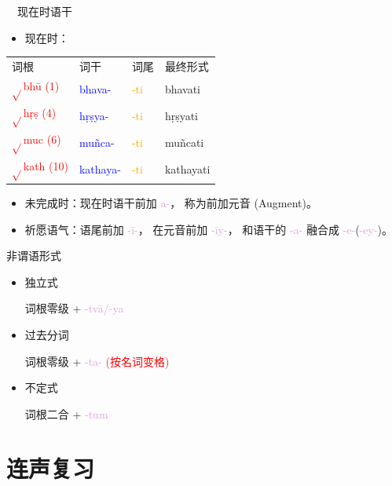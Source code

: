 \documentclass[17pt]{beamer}
\newcommand{\verbroot}[1]{\textcolor{red}{$\sqrt{}$#1}}
\newcommand{\verbstem}[1]{\textcolor{blue}{#1\nobreakdash-}}
\newcommand{\wordending}[1]{\textcolor{Orange}{\nobreakdash-#1}}
\newcommand{\fullpada}[1]{\textcolor{OliveGreen}{#1}}
\newcommand{\pratyaya}[1]{\textcolor{Plum}{#1}}
\newcommand{\veryimportant}[1]{\textcolor{red}{#1}}
\begin{document}
\begin{frame}{\insertsubsection ~~现在时语干}
  \small
  \centering
  \begin{itemize} 
      \item 现在时：
  \end{itemize}

  \begin{tabular}{@{}llll@{}} %
    词根 & 词干  & 词尾  & 最终形式 \\
    \verbroot{bhū (1)} & \verbstem{bhava} & \wordending{ti}  & \fullpada{bhavati}  \\
    \verbroot{hṛṣ (4)} & \verbstem{hṛṣya} & \wordending{ti}  & \fullpada{hṛṣyati}  \\
    \verbroot{muc (6)} & \verbstem{muñca} & \wordending{ti}  & \fullpada{muñcati}  \\
    \verbroot{kath (10)} & \verbstem{kathaya} & \wordending{ti}  & \fullpada{kathayati}  \\
  \end{tabular} 

    \begin{itemize} 
      \item 未完成时：现在时语干前加 \pratyaya{a\nobreakdash-}，
        称为前加元音 (Augment)。
      \item 祈愿语气：语尾前加 \pratyaya{\nobreakdash-ī\nobreakdash-}，
        在元音前加 \pratyaya{\nobreakdash-īy\nobreakdash-}，
        和语干的 \pratyaya{\nobreakdash-a\nobreakdash-} 融合成 \pratyaya{\nobreakdash-e\nobreakdash-}(\pratyaya{\nobreakdash-ey\nobreakdash-})。
    \end{itemize}

\end{frame}

\begin{frame}{非谓语形式}
  \begin{itemize}
    \item 独立式
    
    词根零级 + \pratyaya{\nobreakdash-tvā/-ya} 
    \item 过去分词
    
    词根零级 + \pratyaya{\nobreakdash-ta\nobreakdash-} \veryimportant{(按名词变格)}
    \item 不定式  
    
    词根二合 + \pratyaya{\nobreakdash-tum}
  \end{itemize}
\end{frame}

\section{连声复习}
\end{document}
